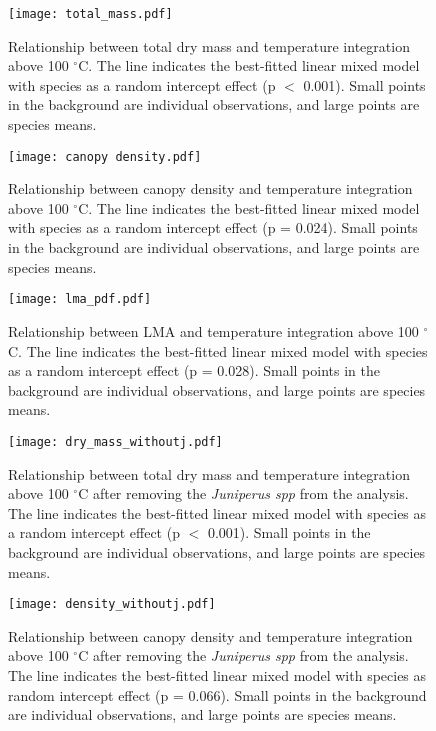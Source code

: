 \documentclass[12pt]{report}
\begin{document}
\begin{figure}
    \centering
    \texttt{[image: total\_mass.pdf]}
    \caption{Relationship between total dry mass and temperature integration above 100 $^{\circ}$C. The line indicates the best-fitted linear mixed model with species as a random intercept effect (p $<$ 0.001). Small points in the background are individual observations, and large points are species means.}
\end{figure}


\begin{figure}
    \centering
    \texttt{[image: canopy density.pdf]}
    \caption{Relationship between canopy density and temperature integration above 100 $^{\circ}$C. The line indicates the best-fitted linear mixed model with species as a random intercept effect (p = 0.024). Small points in the background are individual observations, and large points are species means.}
\end{figure}


\begin{figure}
    \centering
    \texttt{[image: lma\_pdf.pdf]}
    \caption{Relationship between LMA and temperature integration above 100 $^{\circ}$C. The line indicates the best-fitted linear mixed model with species as a random intercept effect (p = 0.028). Small points in the background are individual observations, and large points are species means.}
\end{figure}

\begin{figure}
    \centering
    \texttt{[image: dry\_mass\_withoutj.pdf]}
    \caption{Relationship between total dry mass and temperature integration above 100 $^{\circ}$C after removing the \emph{Juniperus spp} from the analysis. The line indicates the best-fitted linear mixed model with species as a random intercept effect (p $<$ 0.001). Small points in the background are individual observations, and large points are species means.}
\end{figure}

\begin{figure}
    \centering
    \texttt{[image: density\_withoutj.pdf]}
    \caption{Relationship between canopy density and temperature integration above 100 $^{\circ}$C after removing the \emph{Juniperus spp} from the analysis. The line indicates the best-fitted linear mixed model with species as random intercept effect (p = 0.066). Small points in the background are individual observations, and large points are species means.}
\end{figure}
\end{document}

